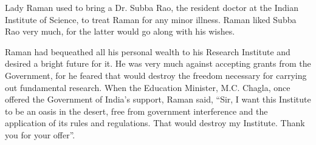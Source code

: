 Lady Raman used to bring a Dr. Subba Rao, the resident
doctor at the Indian Institute of Science, to treat Raman for any
minor illness. Raman liked Subba Rao very much, for the latter
would go along with his wishes.

\medskip
{}
\smallskip



\noindent
Raman had bequeathed all his personal wealth to his
Research Institute and desired a bright future for it. He was very
much against accepting grants from the Government, for he
feared that would destroy the freedom necessary for carrying
out fundamental research. When the Education Minister,
M.C. Chagla, once offered the Government of India's support,
Raman said, ``Sir, I want this Institute to be an oasis in the desert,
free from government interference and the application of its rules
and regulations. That would destroy my Institute. Thank you
for your offer''.

